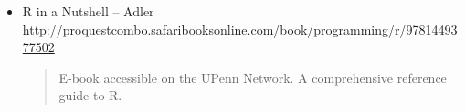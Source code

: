 \documentclass[11pt, letterpaper]{article}
\begin{document}
\begin{itemize}
	           \item R in a Nutshell -- Adler\\ \url{http://proquestcombo.safaribooksonline.com/book/programming/r/9781449377502}         
           	\begin{quote}
           		E-book accessible on the UPenn Network. A comprehensive reference guide to R.
           	\end{quote}
\end{itemize}
\end{document}
